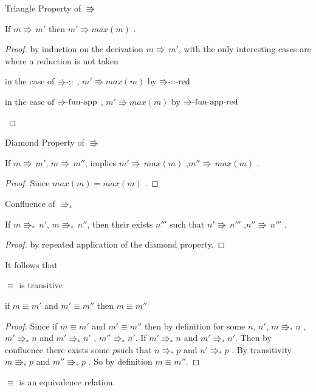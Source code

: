 \begin{lem}
Triangle Property of $\Rrightarrow$

If $m\Rrightarrow\,m'$ then $m'\Rrightarrow max\left(m\right)$ .
\end{lem}

\begin{proof}
by induction on the derivation $m\Rrightarrow\,m'$, with the only
interesting cases are where a reduction is not taken
\begin{casenv}
\item in the case of $\textrm{\ensuremath{\Rrightarrow}-::}$ , $m'\Rrightarrow max\left(m\right)$
by $\textrm{\ensuremath{\Rrightarrow}-::-red}$
\item in the case of $\textrm{\ensuremath{\Rrightarrow}-fun-app}$ , $m'\Rrightarrow max\left(m\right)$
by $\textrm{\ensuremath{\Rrightarrow}-fun-app-red}$ 
\end{casenv}
\end{proof}
\begin{lem}
Diamond Property of $\Rrightarrow$

If $m\Rrightarrow\,m'$, $m\Rrightarrow\,m''$, implies $m'\Rrightarrow\,max\left(m\right)$
,$m''\Rrightarrow\,max\left(m\right)$ . 
\end{lem}

\begin{proof}
Since $max\left(m\right)=max\left(m\right)$ . 
\end{proof}
\begin{thm}
Confluence of $\Rrightarrow_{\ast}$ 

If $m\Rrightarrow_{\ast}\,n'$, $m\Rrightarrow_{\ast}\,n''$, then
their exists $n'''$ such that $n'\Rrightarrow\,n'''$ ,$n''\Rrightarrow\,n'''$
.
\end{thm}

\begin{proof}
by repeated application of the diamond property.
\end{proof}
It follows that
\begin{thm}
$\equiv$ is transitive

if $m\equiv m'$ and $m'\equiv m''$ then $m\equiv m''$
\end{thm}

\begin{proof}
Since if $m\equiv m'$ and $m'\equiv m''$ then by definition for
some $n$, $n'$, $m\Rrightarrow_{\ast}n$ , $m'\Rrightarrow_{\ast}n$
and $m'\Rrightarrow_{\ast}n'$ , $m''\Rrightarrow_{\ast}n'$. If $m'\Rrightarrow_{\ast}n$
and $m'\Rrightarrow_{\ast}n'$. Then by confluence there exists some
$p$such that $n\Rrightarrow_{\ast}p$ and $n'\Rrightarrow_{\ast}p$
. By transitivity $m\Rrightarrow_{\ast}p$ and $m''\Rrightarrow_{\ast}p$
. So by definition $m\equiv m''$. 
\end{proof}
\begin{fact}
$\equiv$ is an equivalence relation.
\end{fact}


